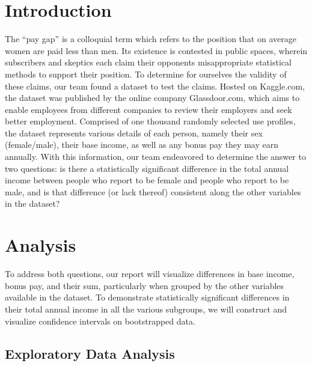 \documentclass[12pt]{article}
\begin{document}


\section{Introduction}

The “pay gap” is a colloquial term which refers to the position that on average women are paid less than men. Its existence is contested in public spaces, wherein subscribers and skeptics each claim their opponents misappropriate statistical methods to support their position. To determine for ourselves the validity of these claims, our team found a dataset to test the claims. Hosted on Kaggle.com, the dataset was published by the online company Glassdoor.com, which aims to enable employees from different companies to review their employers and seek better employment. Comprised of one thousand randomly selected use profiles, the dataset represents various details of each person, namely their sex (female/male), their base income, as well as any bonus pay they may earn annually. With this information, our team endeavored to determine the answer to two questions: is there a statistically significant difference in the total annual income between people who report to be female and people who report to be male, and is that difference (or lack thereof) consistent along the other variables in the dataset?

\section{Analysis}

To address both questions, our report will visualize differences in base income, bonus pay, and their sum, particularly when grouped by the other variables available in the dataset. To demonstrate statistically significant differences in their total annual income in all the various subgroups, we will construct and visualize confidence intervals on bootstrapped data.  

\subsection{Exploratory Data Analysis}
\end{document}
